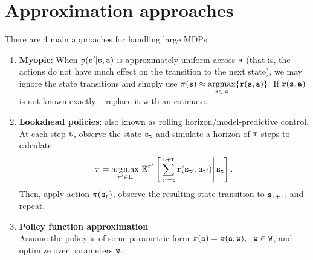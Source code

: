 \section{Approximation approaches}
There are 4 main approaches for handling large MDPs:
\begin{enumerate}
\item \textbf{Myopic}: When ${\tt p}({\tt s}'|{\tt s},{\tt a})$ is approximately uniform across ${\tt a}$ (that is, the actions do not have much effect on the transition to the next state), we may ignore the state transitions and simply use $\pi({\tt s})\approx \underset{{\tt a} \in \mathcal{A}}{\operatorname{argmax}} \{{\tt r}({\tt s},{\tt a})\}$. If ${\tt r}({\tt s},{\tt a})$ is not known exactly -- replace it with an estimate.

\item \textbf{Lookahead policies}: also known as rolling horizon/model-predictive control.\\
At each step ${\tt t}$, observe the state ${\tt s}_{\tt t}$ and simulate a horizon of ${\tt T}$ steps to calculate
$$\pi = \underset{\pi' \in \Pi}{\operatorname{argmax}}\  \mathbb{E}^{\pi'} \left[\left.\sum_{{\tt t}'={\tt t}}^{{\tt t}+{\tt T}} {\tt r}({\tt s}_{{\tt t}'},{\tt a}_{{\tt t}'})\right|{\tt s}_{\tt t}\right].$$
Then, apply action $\pi({\tt s}_{\tt t})$, observe the resulting state transition to ${\tt s}_{{\tt t}+1}$, and repeat.

\item \textbf{Policy function approximation}\\
Assume the policy is of some parametric form $\policy(\state) = \policy(\state; \weight), \ \ \weight \in \mathtt{W}$, and optimize over parameters ${\tt w}$.\\


\end{enumerate}
